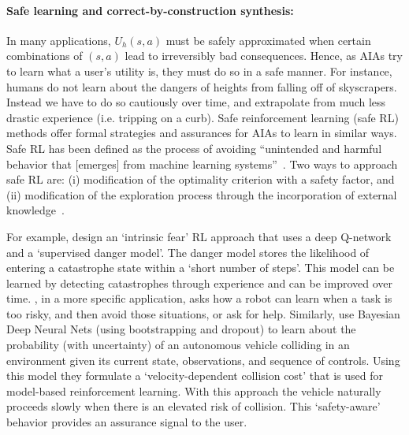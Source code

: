 \paragraph{Safe learning and correct-by-construction synthesis:}
In many applications, $U_h(s,a)$ must be safely approximated when certain combinations of $(s,a)$ lead to irreversibly bad consequences. 
Hence, as AIAs try to learn what a user's utility is, they must do so in a safe manner. 
For instance, humans do not learn about the dangers of heights from falling off of skyscrapers. 
Instead we have to do so cautiously over time, and extrapolate from much less drastic experience (i.e. tripping on a curb). 
Safe reinforcement learning (safe RL) methods offer formal strategies and assurances for AIAs to learn in similar ways.
Safe RL has been defined as the process of avoiding ``unintended and harmful behavior that [emerges] from machine learning systems''~\cite{Amodei2016-xi}. Two ways to approach safe RL are: (i) modification of the optimality criterion with a safety factor, and (ii) modification of the exploration process through the incorporation of external knowledge~\cite{Garcia2015-rs}. 

For example, \citet{Lipton2016-dq} design an `intrinsic fear' RL approach that uses a deep Q-network and a `supervised danger model'. The danger model stores the likelihood of entering a catastrophe state within a `short number of steps'. This model can be learned by detecting catastrophes through experience and can be improved over time. \citet{Curran2016-ij}, in a more specific application, asks how a robot can learn when a task is too risky, and then avoid those situations, or ask for help. 
Similarly, \citet{Kahn2017-vy} use Bayesian Deep Neural Nets (using bootstrapping and dropout) to learn about the probability (with uncertainty) of an autonomous vehicle colliding in an environment given its current state, observations, and sequence of controls. Using this model they formulate a `velocity-dependent collision cost' that is used for model-based reinforcement learning. With this approach the vehicle naturally proceeds slowly when there is an elevated risk of collision. This `safety-aware' behavior provides an assurance signal to the user. 

